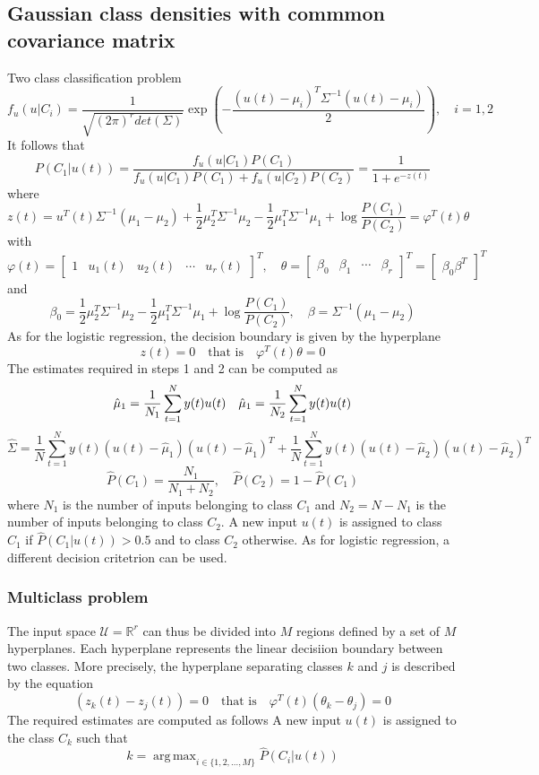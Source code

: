\documentclass{book}
\DeclareMathOperator*{\argmax}{arg\,max}
\begin{document}
\subsection{Gaussian class densities with commmon covariance matrix}
Two class classification problem 
\[
    f_u(u|C_i)=\displaystyle\frac{1}{\sqrt{(2\pi)^rdet(\Sigma)}}\exp \left(-\displaystyle\frac{(u(t)-\mu_i)^T\Sigma^{-1}(u(t)-\mu_i)}{2}\right), \quad i=1,2
\]
It follows that 
\[
    P(C_1|u(t))=\displaystyle\frac{f_u(u|C_1)P(C_1)}{f_u(u|C_1)P(C_1)+f_u(u|C_2)P(C_2)}=\displaystyle\frac{1}{1+e^{-z(t)}}
\]
where
\[
    z(t)=u^T(t)\Sigma^{-1}(\mu_1-\mu_2)+\displaystyle\frac{1}{2}\mu_2^T\Sigma^{-1}\mu_2-\displaystyle\frac{1}{2}\mu_1^T\Sigma^{-1}\mu_1+\log\displaystyle\frac{P(C_1)}{P(C_2)}=\varphi^T(t)\theta
\]
with 
\[
    \varphi(t)=\begin{bmatrix}
        1 & u_1(t) & u_2(t) & \cdots & u_r(t)
    \end{bmatrix}^T, \quad \theta=\begin{bmatrix}
        \beta_0 & \beta_1 & \cdots & \beta_r
    \end{bmatrix}^T=\begin{bmatrix}
        \beta_0 \beta^T
    \end{bmatrix}^T
\]
and
\[
    \beta_0=\displaystyle\frac{1}{2}\mu_2^T\Sigma^{-1}\mu_2-\displaystyle\frac{1}{2}\mu_1^T\Sigma^{-1}\mu_1+\log \displaystyle\frac{P(C_1)}{P(C_2)},\quad \beta=\Sigma^{-1}(\mu_1-\mu_2)
\]
As for the logistic regression, the decision boundary is given by the hyperplane 
\[
    z(t)=0 \quad \text{that is} \quad \varphi^T(t)\theta=0
\]
The estimates required in steps 1 and 2 can be computed as 
\[
    \hat{\mu}_1=\displaystyle\frac{1}{N_1}\displaystyle\sum_{t=1}^{N}y(t)u(t) \quad \hat{\mu}_1=\displaystyle\frac{1}{N_2}\displaystyle\sum_{t=1}^{N}y(t)u(t)\\
\]
\[
    \hat{\Sigma}=\displaystyle\frac{1}{N}\displaystyle\sum_{t=1}^{N}y(t)(u(t)-\hat{\mu}_1)(u(t)-\hat{\mu}_1)^T+\displaystyle\frac{1}{N}\displaystyle\sum_{t=1}^{N}y(t)(u(t)-\hat{\mu}_2)(u(t)-\hat{\mu}_2)^T
\]
\[
    \hat{P}(C_1)=\displaystyle\frac{N_1}{N_1+N_2},\quad\hat{P}(C_2)=1-\hat{P}(C_1)
\]
where $N_1$ is the number of inputs belonging to class $C_1$ and $N_2=N-N_1$ is the number of inputs belonging to class $C_2$. A new input $u(t)$ is assigned to class $C_1$ if $\hat{P}(C_1|u(t))>0.5$ and to class $C_2$ otherwise. As for logistic regression, a different decision critetrion can be used. 
\subsubsection{Multiclass problem}
The input space $\mathcal{U}=\mathbb{R}^r$ can thus be divided into $M$ regions defined by a set of $M$ hyperplanes. Each hyperplane represents the linear decisiion boundary between two classes. More precisely, the hyperplane separating classes $k$ and $j$ is described by the equation 
\[
    (z_k(t)-z_j(t))=0 \quad \text{that is} \quad \varphi^T(t)(\theta_k-\theta_j)=0
\]
The required estimates are computed as follows 
A new input $u(t)$ is assigned to the class $C_k$ such that 
\[
    k=\argmax_{i\in\{1,2,\dots,M\}}\hat{P}(C_i|u(t))
\]
\end{document}
